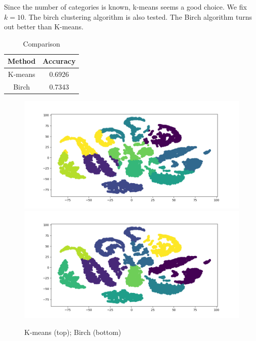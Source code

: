 \documentclass{article}
\begin{document}
{{        Since the number of categories is known, k-means seems a good choice. We fix $k=10$. 
        The birch clustering algorithm is also tested. The Birch algorithm turns out better than K-means.

        \begin{table}[!hbp]
            \centering
            \begin{tabular}{|c|c|}
            \hline
            Method & Accuracy \\
            \hline
            K-means & 0.6926 \\
            \hline
            Birch & 0.7343 \\
            \hline
            \end{tabular}
            \caption{Comparison}
        \end{table}

        \begin{figure}[H]
            \centering
            \includegraphics[width = 0.9\linewidth]{./src3/kmeans.png}
            \includegraphics[width = 0.9\linewidth]{./src3/birch.png}
            \caption{K-means (top); Birch (bottom)}
        \end{figure}
    }
}
\end{document}

